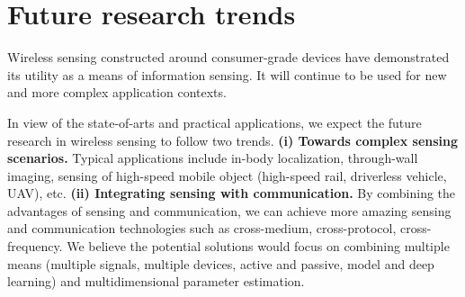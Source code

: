 \section{Future research trends}

Wireless sensing constructed around consumer-grade devices have demonstrated its utility as a means of information sensing. It will
continue to be used for new and more complex application contexts.

In view of the state-of-arts and practical applications, we expect the future research in wireless sensing to follow two trends.
\textbf{(i) Towards complex sensing scenarios.} Typical applications include in-body localization, through-wall imaging, sensing of
high-speed mobile object (high-speed rail, driverless vehicle, UAV), etc. \textbf{(ii) Integrating sensing with communication.} By
combining the advantages of sensing and communication, we can achieve more amazing sensing and communication technologies such as
cross-medium, cross-protocol, cross-frequency. We believe the potential solutions would focus on combining multiple means (multiple
signals, multiple devices, active and passive, model and deep learning) and multidimensional parameter estimation.
